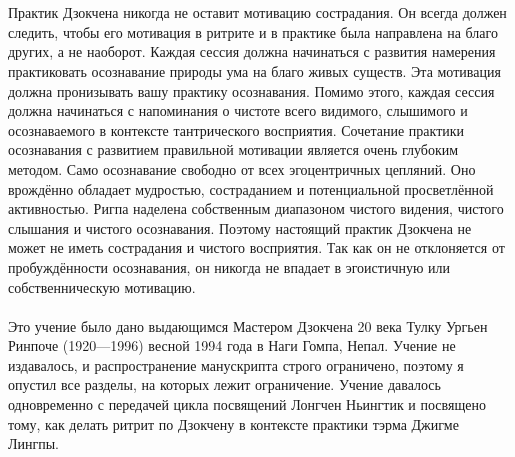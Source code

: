 \\ \\ Практик Дзокчена никогда не оставит мотивацию сострадания. Он всегда должен следить, чтобы его мотивация в ритрите и в практике была направлена на благо других, а не наоборот. Каждая сессия должна начинаться с развития намерения практиковать осознавание природы ума на благо живых существ. Эта мотивация должна пронизывать вашу практику осознавания. Помимо этого, каждая сессия должна начинаться с напоминания о чистоте всего видимого, слышимого и осознаваемого в контексте тантрического восприятия. Сочетание практики осознавания с развитием правильной мотивации является очень глубоким методом. Само осознавание свобод\-но от всех эгоцентричных цепляний. Оно врождённо обладает мудростью, состраданием и потенциальной просветлённой активностью. Ригпа наделена собственным диапазоном чисто\-го видения, чистого слышания и чистого осознавания. Поэтому настоящий практик Дзокчена не может не иметь сострадания и чистого восприятия. Так как он не отклоняется от пробуждённости осознавания, он никогда не впадает в эгоистичную или собственническую мотивацию.
\\
\vspace{1cm}
\\
\scriptsize
Это учение было дано выдающимся Мастером Дзокчена 20 века Тулку Ургьен
Ринпоче (1920—1996) весной 1994 года в Наги Гомпа, Непал. Учение не
издавалось, и распростране\-ние манускрипта строго ограничено, поэтому
я опустил все разделы, на которых лежит ограничение. Учение давалось
одновременно с передачей цикла посвящений Лонгчен Ньингтик и посвящено
тому, как делать ритрит по Дзокчену в контексте практики тэрма Джигме Лингпы.
\normalsize
